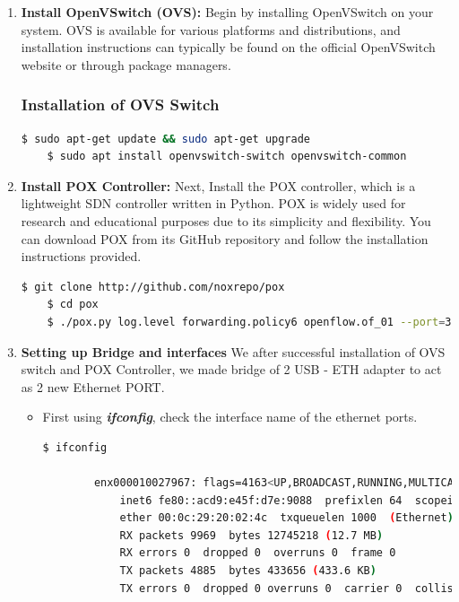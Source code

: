 \documentclass[12pt,letterpaper]{article}
\begin{document}
        \begin{enumerate}
        
            \item \textbf{Install OpenVSwitch (OVS):} Begin by installing OpenVSwitch on your system. OVS is available for various platforms and distributions, and installation instructions can typically be found on the official OpenVSwitch website or through package managers.

            \subsubsection{Installation of OVS Switch}

\begin{lstlisting}[language=bash]
    $ sudo apt-get update && sudo apt-get upgrade 
    $ sudo apt install openvswitch-switch openvswitch-common
\end{lstlisting}

            \item \textbf{Install POX Controller:} Next, Install the POX controller, which is a lightweight SDN controller written in Python. POX is widely used for research and educational purposes due to its simplicity and flexibility. You can download POX from its GitHub repository and follow the installation instructions provided.

\begin{lstlisting}[language=bash]
    $ git clone http://github.com/noxrepo/pox
    $ cd pox
    $ ./pox.py log.level forwarding.policy6 openflow.of_01 --port=3030
\end{lstlisting}            


    \item \textbf{Setting up Bridge and interfaces} We after successful installation of OVS switch and POX Controller, we made bridge of 2 USB - ETH adapter to act as 2 new Ethernet PORT.

        \begin{itemize}[label=$\rightarrow$]
            \item First using \textbf{\textit{ifconfig}}, check the interface name of the ethernet ports.
\begin{lstlisting}[language=bash]
    $ ifconfig

        enx000010027967: flags=4163<UP,BROADCAST,RUNNING,MULTICAST>  mtu 1500
            inet6 fe80::acd9:e45f:d7e:9088  prefixlen 64  scopeid 0x20<link>
            ether 00:0c:29:20:02:4c  txqueuelen 1000  (Ethernet)
            RX packets 9969  bytes 12745218 (12.7 MB)
            RX errors 0  dropped 0  overruns 0  frame 0
            TX packets 4885  bytes 433656 (433.6 KB)
            TX errors 0  dropped 0 overruns 0  carrier 0  collisions 0


\end{lstlisting}
\end{itemize}
\end{enumerate}
\end{document}
